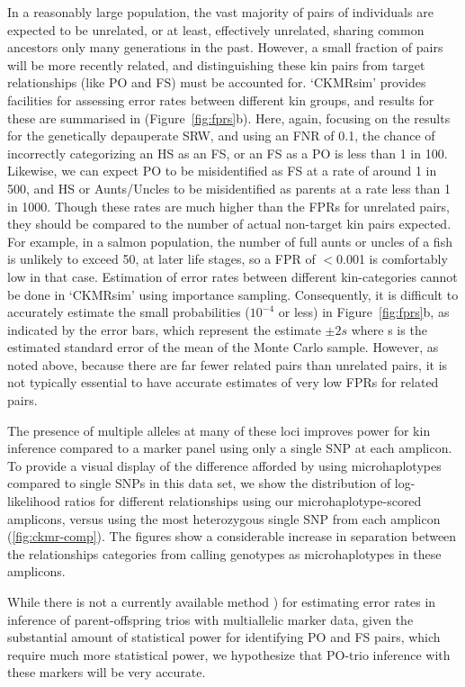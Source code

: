 In a reasonably large population, the vast majority of pairs of individuals are expected to
be unrelated, or at least, effectively unrelated, sharing common ancestors only many generations
in the past.  However, a small fraction of pairs will be more recently related, and distinguishing these
kin pairs from target relationships (like PO and FS) must be accounted for.  `CKMRsim' provides
facilities for assessing error rates between different kin groups, and results for these are
summarised in (Figure~\ref{fig:fprs}b). Here, again, focusing on the results for the genetically
depauperate SRW, and using an FNR of 0.1, the chance of incorrectly
categorizing an HS as an FS,  or an FS as a PO is less than 1 in 100. Likewise, 
we can expect PO to be misidentified as FS at a rate of around 1 in 500, and 
HS or Aunts/Uncles to be misidentified as parents at a rate less than 1 in 1000.
Though these rates are much higher than the FPRs for unrelated pairs, they should be
compared to the number of actual non-target kin pairs expected.  For example, in a salmon
population, the number of full aunts or uncles of a fish is unlikely to exceed 50, 
at later life stages,  so a FPR of  $<$0.001 is comfortably low in that case.
Estimation of
error rates between different kin-categories cannot be done in `CKMRsim' using
importance sampling. Consequently, it is difficult to accurately estimate the small
probabilities ($10^{-4}$ or less) in Figure~\ref{fig:fprs}b, as indicated by the error bars,
which represent the estimate $\pm2s$ where s is the estimated standard error of the
mean of the Monte Carlo sample.  However, as noted above, because there are
far fewer related pairs than unrelated pairs, it is not typically essential to
have accurate estimates of very low FPRs for related pairs.  


The presence of multiple alleles at many of these loci improves power for
kin inference compared to a marker panel using only a single SNP at each
amplicon.  To provide a visual display of the difference afforded by using
microhaplotypes compared to single SNPs in this data set, we show the
distribution of log-likelihood ratios for different relationships using our microhaplotype-scored
amplicons, versus using the most heterozygous single SNP from each
amplicon (\ref{fig:ckmr-comp}).  The figures show a considerable increase
in separation between the relationships categories from calling genotypes
as microhaplotypes in these amplicons.

While there is not a currently available method \citep[like that of][]{anderson2006power}) for estimating error rates in
inference of parent-offspring trios with multiallelic marker data, given the substantial amount of statistical power for identifying
PO and FS pairs, which 
require much more statistical power, we hypothesize that PO-trio inference with these markers will be very accurate.








